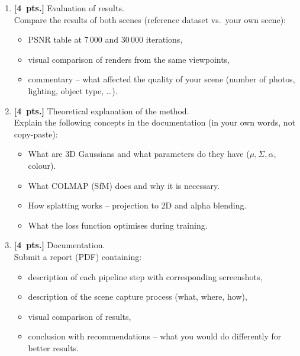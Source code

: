 \documentclass{article}
\begin{document}
\begin{enumerate}
Run the full pipeline in the same way as in Task~1.
Report the achieved PSNR and visually compare the result with the reference dataset.

\item \textbf{[4~pts.]} Evaluation of results.\\
Compare the results of both scenes (reference dataset vs.\ your own scene):
\begin{itemize}
    \item PSNR table at 7\,000 and 30\,000 iterations,
    \item visual comparison of renders from the same viewpoints,
    \item commentary -- what affected the quality of your scene
          (number of photos, lighting, object type, \ldots).
\end{itemize}

\item \textbf{[4~pts.]} Theoretical explanation of the method.\\
Explain the following concepts in the documentation (in your own words, not copy-paste):
\begin{itemize}
    \item What are 3D Gaussians and what parameters do they have ($\mu, \Sigma, \alpha$, colour).
    \item What COLMAP (SfM) does and why it is necessary.
    \item How splatting works -- projection to 2D and alpha blending.
    \item What the loss function optimises during training.
\end{itemize}

\item \textbf{[4~pts.]} Documentation.\\
Submit a report (PDF) containing:
\begin{itemize}
    \item description of each pipeline step with corresponding screenshots,
    \item description of the scene capture process (what, where, how),
    \item visual comparison of results,
    \item conclusion with recommendations -- what you would do differently for better results.
\end{itemize}

\end{enumerate}
\end{document}
